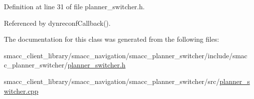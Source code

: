 Definition at line 31 of file planner\+\_\+switcher.\+h.



Referenced by dynreconf\+Callback().



The documentation for this class was generated from the following files\+:\begin{DoxyCompactItemize}
\item 
smacc\+\_\+client\+\_\+library/smacc\+\_\+navigation/smacc\+\_\+planner\+\_\+switcher/include/smacc\+\_\+planner\+\_\+switcher/\hyperlink{planner__switcher_8h}{planner\+\_\+switcher.\+h}\item 
smacc\+\_\+client\+\_\+library/smacc\+\_\+navigation/smacc\+\_\+planner\+\_\+switcher/src/\hyperlink{planner__switcher_8cpp}{planner\+\_\+switcher.\+cpp}\end{DoxyCompactItemize}
